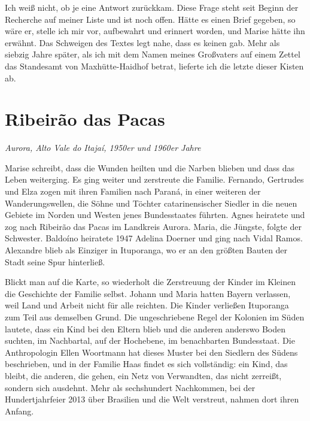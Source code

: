 \documentclass[
  ngerman,
  11pt,
  openany]{book}
\begin{document}
Ich weiß nicht, ob je eine Antwort zurückkam. Diese Frage steht seit
Beginn der Recherche auf meiner Liste und ist noch offen. Hätte es einen
Brief gegeben, so wäre er, stelle ich mir vor, aufbewahrt und erinnert
worden, und Marise hätte ihn erwähnt. Das Schweigen des Textes legt
nahe, dass es keinen gab. Mehr als siebzig Jahre später, als ich mit dem
Namen meines Großvaters auf einem Zettel das Standesamt von
Maxhütte-Haidhof betrat, lieferte ich die letzte dieser Kisten ab.

\section{Ribeirão das Pacas}\label{ribeiruxe3o-das-pacas}

\emph{Aurora, Alto Vale do Itajaí, 1950er und 1960er Jahre}

Marise schreibt, dass die Wunden heilten und die Narben blieben und dass
das Leben weiterging. Es ging weiter und zerstreute die Familie.
Fernando, Gertrudes und Elza zogen mit ihren Familien nach Paraná, in
einer weiteren der Wanderungswellen, die Söhne und Töchter
catarinensischer Siedler in die neuen Gebiete im Norden und Westen jenes
Bundesstaates führten. Agnes heiratete und zog nach Ribeirão das Pacas
im Landkreis Aurora. Maria, die Jüngste, folgte der Schwester. Baldoíno
heiratete 1947 Adelina Doerner und ging nach Vidal Ramos. Alexandre
blieb als Einziger in Ituporanga, wo er an den größten Bauten der Stadt
seine Spur hinterließ.

Blickt man auf die Karte, so wiederholt die Zerstreuung der Kinder im
Kleinen die Geschichte der Familie selbst. Johann und Maria hatten
Bayern verlassen, weil Land und Arbeit nicht für alle reichten. Die
Kinder verließen Ituporanga zum Teil aus demselben Grund. Die
ungeschriebene Regel der Kolonien im Süden lautete, dass ein Kind bei
den Eltern blieb und die anderen anderswo Boden suchten, im Nachbartal,
auf der Hochebene, im benachbarten Bundesstaat. Die Anthropologin Ellen
Woortmann hat dieses Muster bei den Siedlern des Südens beschrieben, und
in der Familie Haas findet es sich vollständig: ein Kind, das bleibt,
die anderen, die gehen, ein Netz von Verwandten, das nicht zerreißt,
sondern sich ausdehnt. Mehr als sechshundert Nachkommen, bei der
Hundertjahrfeier 2013 über Brasilien und die Welt verstreut, nahmen dort
ihren Anfang.
\end{document}
